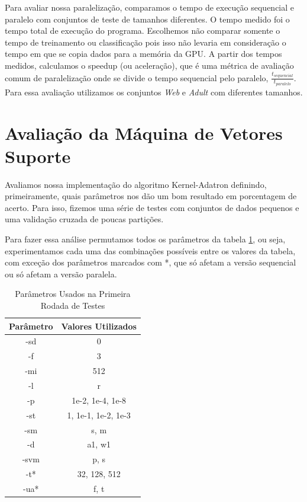 Para avaliar nossa paralelização, comparamos o tempo de execução sequencial e paralelo com conjuntos de teste de tamanhos diferentes. O tempo medido foi o tempo total de execução do programa. Escolhemos não comparar somente o tempo de treinamento ou classificação pois isso não levaria em consideração o tempo em que se copia dados para a memória da GPU. A partir dos tempos medidos, calculamos o speedup (ou aceleração), que é uma métrica de avaliação comum de paralelização onde se divide o tempo sequencial pelo paralelo, $\frac{t_{sequencial}}{t_{paralelo}}$. 
Para essa avaliação utilizamos os conjuntos \emph{Web} e \emph{Adult} com diferentes tamanhos.

\section{Avaliação da Máquina de Vetores Suporte}
Avaliamos nossa implementação do algoritmo Kernel-Adatron definindo, primeiramente, quais parâmetros nos dão um bom resultado em porcentagem de acerto. Para isso, fizemos uma série de testes com conjuntos de dados pequenos e uma validação cruzada de poucas partições.

Para fazer essa análise permutamos todos os parâmetros da tabela \ref{tab:testParameters1}, ou seja, experimentamos cada uma das combinações possíveis entre os valores da tabela, com exceção dos parâmetros marcados com *, que só afetam a versão sequencial ou só afetam a versão paralela.

\begin{table}
    \caption{Parâmetros Usados na Primeira Rodada de Testes}
    \label{tab:testParameters1}
    \centering
    \begin{tabular}{|c|c|} \hline
        Parâmetro & Valores Utilizados \\ \hline
        -sd & 0 \\ \hline
        -f & 3 \\ \hline
        -mi & 512 \\ \hline
        -l & r \\ \hline
        -p & 1e-2, 1e-4, 1e-8 \\ \hline
        -st & 1, 1e-1, 1e-2, 1e-3 \\ \hline
        -sm & s, m \\ \hline
        -d & a1, w1\\ \hline
        -svm & p, s\\ \hline
        -t* & 32, 128, 512\\ \hline
        -ua* & f, t \\ \hline
    \end{tabular}
\end{table}

